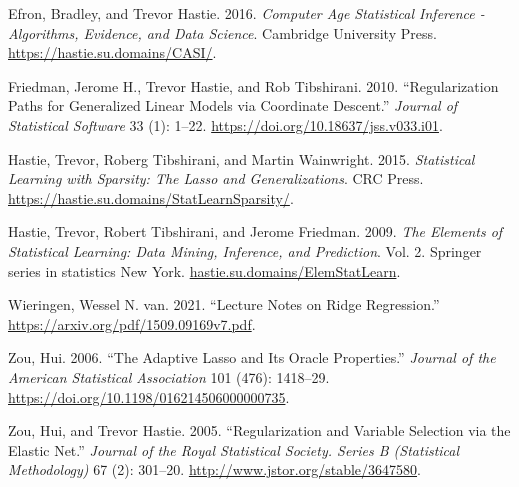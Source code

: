 \documentclass[
  letterpaper,
  DIV=11,
  numbers=noendperiod]{scrartcl}
\newlength{\cslhangindent}
\newlength{\cslentryspacingunit} %
\newenvironment{CSLReferences}[2] %
 {%
  \setlength{\parindent}{0pt}
  \ifodd #1
  \let\oldpar\par
  \def\par{\hangindent=\cslhangindent\oldpar}
  \fi
  \setlength{\parskip}{#2\cslentryspacingunit}
 }%
 {}
\begin{document}
\hypertarget{refs}{}
\begin{CSLReferences}{1}{0}
\leavevmode{}%
Efron, Bradley, and Trevor Hastie. 2016. \emph{Computer Age Statistical
Inference - Algorithms, Evidence, and Data Science}. Cambridge
University Press. \url{https://hastie.su.domains/CASI/}.

\leavevmode{}%
Friedman, Jerome H., Trevor Hastie, and Rob Tibshirani. 2010.
{``Regularization Paths for Generalized Linear Models via Coordinate
Descent.''} \emph{Journal of Statistical Software} 33 (1): 1--22.
\url{https://doi.org/10.18637/jss.v033.i01}.

\leavevmode{}%
Hastie, Trevor, Roberg Tibshirani, and Martin Wainwright. 2015.
\emph{Statistical Learning with Sparsity: The Lasso and
Generalizations}. CRC Press.
\url{https://hastie.su.domains/StatLearnSparsity/}.

\leavevmode{}%
Hastie, Trevor, Robert Tibshirani, and Jerome Friedman. 2009. \emph{The
Elements of Statistical Learning: Data Mining, Inference, and
Prediction}. Vol. 2. Springer series in statistics New York.
\href{https://hastie.su.domains/ElemStatLearn}{hastie.su.domains/ElemStatLearn}.

\leavevmode{}%
Wieringen, Wessel N. van. 2021. {``Lecture Notes on Ridge Regression.''}
\url{https://arxiv.org/pdf/1509.09169v7.pdf}.

\leavevmode{}%
Zou, Hui. 2006. {``The Adaptive Lasso and Its Oracle Properties.''}
\emph{Journal of the American Statistical Association} 101 (476):
1418--29. \url{https://doi.org/10.1198/016214506000000735}.

\leavevmode{}%
Zou, Hui, and Trevor Hastie. 2005. {``Regularization and Variable
Selection via the Elastic Net.''} \emph{Journal of the Royal Statistical
Society. Series B (Statistical Methodology)} 67 (2): 301--20.
\url{http://www.jstor.org/stable/3647580}.

\end{CSLReferences}
\end{document}
